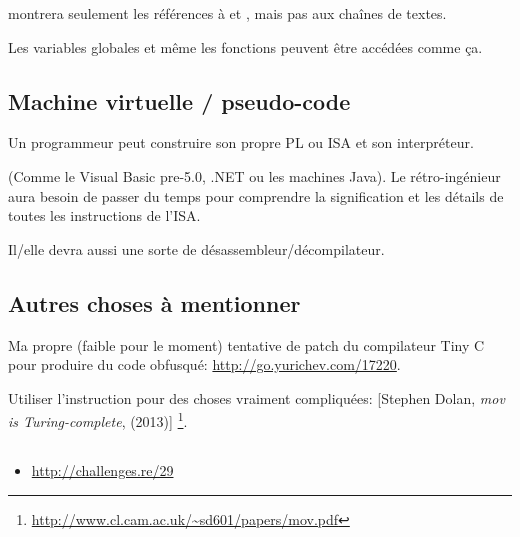 \IDA{} montrera seulement les références à  et ,
mais pas aux chaînes de textes.

Les variables globales et même les fonctions peuvent être accédées comme ça.

\subsection{Machine virtuelle / pseudo-code}

Un programmeur peut construire son propre \ac{PL} ou \ac{ISA} et son interpréteur.

(Comme le Visual Basic pre-5.0, .NET ou les machines Java).
Le rétro-ingénieur aura besoin de passer du temps pour comprendre la signification
et les détails de toutes les instructions de l'\ac{ISA}.

Il/elle devra aussi une sorte de désassembleur/décompilateur.

\subsection{Autres choses à mentionner}

Ma propre (faible pour le moment) tentative de patch du compilateur Tiny C pour
produire du code obfusqué: \url{http://go.yurichev.com/17220}.

Utiliser l'instruction \MOV pour des choses vraiment compliquées:
[Stephen Dolan, \emph{mov is Turing-complete}, (2013)]
\footnote{\AlsoAvailableAs \url{http://www.cl.cam.ac.uk/~sd601/papers/mov.pdf}}. 

\subsection{\Exercise}

\begin{itemize}
	\item \url{http://challenges.re/29}
\end{itemize}


